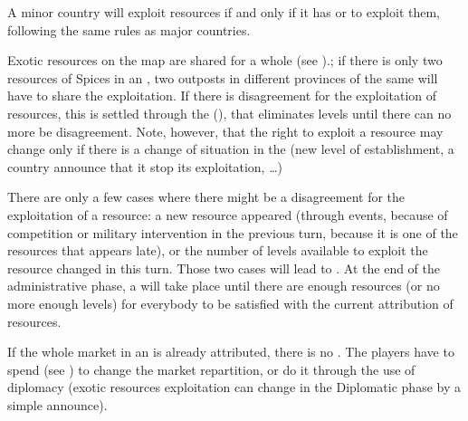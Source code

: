 \aparag A \ROTW minor country will exploit resources if and only if it has \TP
or \COL to exploit them, following the same rules as major countries.

\aparag Exotic resources on the \ROTW map are shared for a whole \Area (see
).; if there is only two resources of Spices in
an \Area, two outposts in different provinces of the same \Area will have to
share the exploitation.
\bparag If there is disagreement for the exploitation of resources, this
is settled through the 
(), that eliminates levels until
there can no more be disagreement.
\bparag Note, however, that the right to exploit a resource may change
only if there is a change of situation in the \Area (new level of
establishment, a country announce that it stop its exploitation,
\ldots)

 There are only a few cases where there might be a
disagreement for the exploitation of a resource: a new resource appeared
(through events, because of competition or military intervention in the
previous turn, because it is one of the resources that appears late), or the
number of levels available to exploit the resource changed in this turn.
\bparag Those two cases will lead to . At the end
of the administrative phase, a  will take place until there
are enough resources (or no more enough levels) for everybody to be satisfied
with the current attribution of resources.

\bparag If the whole market in an \Area is already attributed, there is
no . The players have to spend
 (see )
to change the market repartition, or do it through the use of diplomacy
(exotic resources exploitation can change in the Diplomatic phase by a
simple announce).

